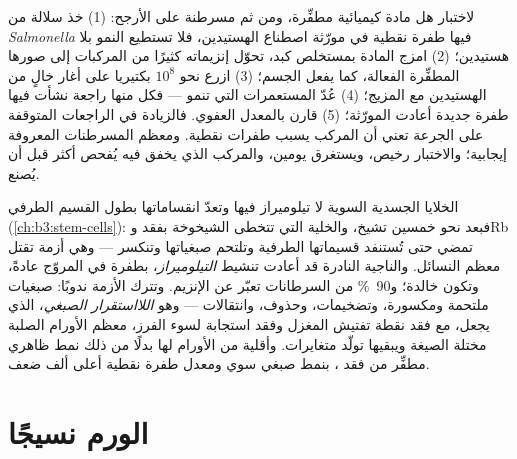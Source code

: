 \begin{method}\label{met:b3:cancer-biology:ames}
لاختبار هل مادة كيميائية مطفِّرة، ومن ثم مسرطنة على الأرجح:
(1) خذ سلالة من \emph{Salmonella} فيها طفرة نقطية
في مورّثة اصطناع الهستيدين، فلا تستطيع النمو بلا هستيدين؛
(2) امزج المادة بمستخلص كبد، تحوّل إنزيماته كثيرًا من
المركبات إلى صورها المطفِّرة الفعالة، كما يفعل الجسم؛ (3)
ازرع نحو $10^{8}$ بكتيريا على أغار خالٍ من الهستيدين مع المزيج؛
(4) عُدّ المستعمرات التي تنمو --- فكل منها راجعة نشأت فيها طفرة
جديدة أعادت المورّثة؛ (5) قارن بالمعدل العفوي. فالزيادة
في الراجعات المتوقفة على الجرعة تعني أن المركب يسبب طفرات
نقطية. ومعظم المسرطنات المعروفة إيجابية؛ والاختبار رخيص،
ويستغرق يومين، والمركب الذي يخفق فيه يُفحص أكثر
قبل أن يُصنع.
\end{method}

\begin{definition}\label{def:b3:cancer-biology:telomerase}
الخلايا الجسدية السوية لا تيلوميراز فيها وتعدّ انقساماتها
بطول القسيم الطرفي (\cref{ch:b3:stem-cells}): فبعد نحو خمسين تشيخ،
والخلية التي تتخطى الشيخوخة بفقد  وRb تمضي
حتى تُستنفد قسيماتها الطرفية وتلتحم صبغياتها وتنكسر
--- وهي أزمة تقتل معظم النسائل. والناجية النادرة قد أعادت تنشيط
\emph{التيلوميراز}، بطفرة في المروّج عادةً، وتكون خالدة؛
و\qty{90}{\%} من السرطانات تعبّر عن الإنزيم. وتترك الأزمة ندوبًا:
صبغيات ملتحمة ومكسورة، وتضخيمات، وحذوف، وانتقالات
--- وهو \emph{اللااستقرار الصبغي}، الذي يجعل، مع فقد نقطة تفتيش
المغزل وفقد استجابة  لسوء الفرز، معظم الأورام
الصلبة مختلة الصيغة ويبقيها تولّد متغايرات. وأقلية من
الأورام لها بدلًا من ذلك نمط ظاهري مطفِّر من فقد ،
بنمط صبغي سوي ومعدل طفرة نقطية أعلى ألف ضعف.
\end{definition}

\section{الورم نسيجًا}

